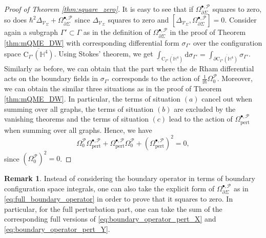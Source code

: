 \documentclass[11pt,colorinlistoftodos]{amsart}
\numberwithin{equation}{subsection}
\theoremstyle{plain}
\theoremstyle{definition}
\newtheorem{rem}[thm]{Remark}
\theoremstyle{remark}
\newcommand{\dd}{{\mathrm{d}}}
\newcommand{\de}{\partial}
\newcommand{\calP}{\mathcal{P}}
\newcommand{\I}{\mathrm{i}}
\newcommand{\calV}{\mathcal{V}}
\begin{document}
\begin{proof}[Proof of Theorem \ref{thm:square_zero}]
It is easy to see that if $\Omega^{\bullet,\calP}_{\de\Sigma}$ squares to zero, so does $\hbar^2\Delta_{\calV_\Sigma}+\Omega^{\bullet,\calP}_{\de\Sigma}$ since $\Delta_{\calV_\Sigma}$ squares to zero and $[\Delta_{\calV_\Sigma},\Omega^{\bullet,\calP}_{\de\Sigma}]=0$. Consider again a subgraph $\Gamma'\subset\Gamma$ as in the definition of $\Omega^{\bullet,\calP}_{\de\Sigma}$ in the proof of Theorem \ref{thm:mQME_DW} with corresponding differential form $\sigma_{\Gamma'}$ over the configuration space $\overline{\mathrm{C}_{\Gamma'}(\mathbb{H}^4)}$. Using Stokes' theorem, we get $\int_{\overline{\mathrm{C}_{\Gamma'}(\mathbb{H}^4)}}\dd\sigma_{\Gamma'}=\int_{\de\overline{\mathrm{C}_{\Gamma'}(\mathbb{H}^4)}}\sigma_{\Gamma'}$. Similarly as before, we can obtain that the part where the de Rham differential acts on the boundary fields in $\sigma_{\Gamma'}$ corresponds to the action of $\frac{1}{\I\hbar}\Omega_0^\calP$. Moreover, we can obtain the similar three situations as in the proof of Theorem \ref{thm:mQME_DW}. In particular, the terms of situation $(a)$ cancel out when summing over all graphs, the terms of situation $(b)$ are excluded by the vanishing theorems and the terms of situation $(c)$ lead to the action of $\Omega^{\bullet,\calP}_\mathrm{pert}$ when summing over all graphs. Hence, we have 
\[
\Omega_0^\calP\Omega^{\bullet,\calP}_\mathrm{pert}+\Omega^{\bullet,\calP}_\mathrm{pert}\Omega_0^\calP+(\Omega^{\bullet,\calP}_\mathrm{pert})^2=0,
\]
since $(\Omega_0^\calP)^2=0$. 
\end{proof}

\begin{rem}
Instead of considering the boundary operator in terms of boundary configuration space integrals, one can also take the explicit form of $\Omega^{\bullet,\calP}_{\de\Sigma}$ as in \eqref{eq:full_boundary_operator} in order to prove that it squares to zero. In particular, for the full perturbation part, one can take the sum of the corresponding full versions of \eqref{eq:boundary_operator_pert_X} and \eqref{eq:boundary_operator_pert_Y}.
\end{rem}
\end{document}
